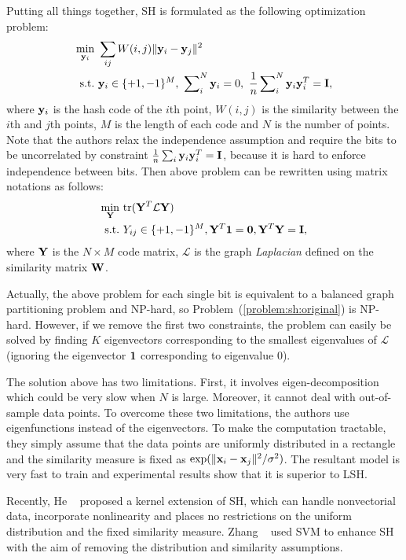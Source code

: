 Putting all things together, \mbox{SH} is formulated as the following optimization problem:
\begin{align}
\min_{{\bf y}_i}&~\sum_{ij}W(i,j)\|{\bf y}_i-{\bf y}_j\|^2\nonumber\\
\mathop{\rm s.t.}&~{\bf y}_i\in\{+1,-1\}^{M},~\sum\nolimits_i\nolimits^{N}{\bf y}_i=0,~\frac{1}{n}\sum\nolimits_i\nolimits^{N}{\bf y}_i{\bf y}_i^T={\bf I},\nonumber
\end{align}
where ${\bf y}_i$ is the hash code of the $i$th point, $W(i,j)$ is the similarity between the $i$th and $j$th points, $M$ is the length of each code and $ N $ is the number of points. Note that the authors relax the independence assumption and require the bits to be uncorrelated by constraint $ \frac{1}{n}\sum_i{\bf y}_i{\bf y}_i^T={\bf I} $, because it is hard to enforce independence between bits. Then above problem can be rewritten using matrix notations as follows:
\begin{align}
\min_{{\bf Y}}&~\mathrm{tr}({\bf Y}^T\mathcal{L}{\bf Y})\nonumber\\
\mathop{\rm s.t.}&~Y_{ij}\in\{+1,-1\}^{M},{\bf Y}^T{\bf 1}={\bf 0},{\bf Y}^T{\bf Y}={\bf I},
\label{problem:sh:original}
\end{align}
where ${\bf Y}$ is the $N\times M$ code matrix, $\mathcal{L}$ is the graph \textit{Laplacian} defined on the similarity matrix ${\bf W}$. 

Actually, the above problem for each single bit is equivalent to a balanced graph partitioning problem and NP-hard, so Problem~(\ref{problem:sh:original}) is NP-hard. However, if we remove the first two constraints, the problem can easily be solved by finding $K$ eigenvectors corresponding to the smallest eigenvalues of $\mathcal{L}$ (ignoring the eigenvector ${\bf 1}$ corresponding to eigenvalue 0). 

The solution above has two limitations. First, it involves eigen-decomposition which could be very slow when $N$ is large. Moreover, it cannot deal with out-of-sample data points. To overcome these two limitations, the authors use eigenfunctions instead of the eigenvectors. To make the computation tractable, they simply assume that the data points are uniformly distributed in a rectangle and the similarity measure is fixed as $ \exp(\|{\bf x}_i-{\bf x}_j\|^2/\sigma^2) $. The resultant model is very fast to train and experimental results show that it is superior to \mbox{LSH}. 

Recently, He \etal~\cite{he2010kdd} proposed a kernel extension of \mbox{SH}, which can handle nonvectorial data, incorporate nonlinearity and places no restrictions on the uniform distribution and the fixed similarity measure. Zhang \etal~\cite{zhang2010sigir,zhang2010fgsir} used \mbox{SVM} to enhance \mbox{SH} with the aim of removing the distribution and similarity assumptions.


